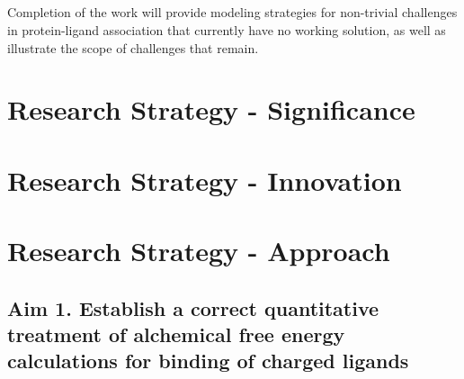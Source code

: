 \documentclass[10pt,final]{article}
\newif\ifinstr
\newcommand{\instr}[1]{\ifdraft{\ifinstr {\color{cyan}\emph{#1}} \fi}{}}
\begin{document}
\subsection*{} %

Completion of the work will provide modeling strategies for non-trivial challenges in protein-ligand association that currently have no working solution, as well as illustrate the scope of challenges that remain.

\section*{Research Strategy - Significance}
\instr{General background, significance in terms of basic science and disease relevance.}


\section*{Research Strategy - Innovation}
\instr{Explain how your proposal differs from what others have tried.}

\section*{Research Strategy - Approach}
\instr{Approach: More specific background information. Describe in detail the experimental design and research methods to be used. Technical hurdles to be overcome should be mentioned. Alternative approaches should be given for experiments that may not be feasible. Discussion of expected or possible results and their interpretation. Best format for each specific aim: a) rationale, b) methods, c) expected results, d) alternatives. Theory aims should follow a similar structure where possible.}



\subsection*{Aim 1. Establish a correct quantitative treatment of alchemical free energy calculations for binding of charged ligands}
\end{document}
